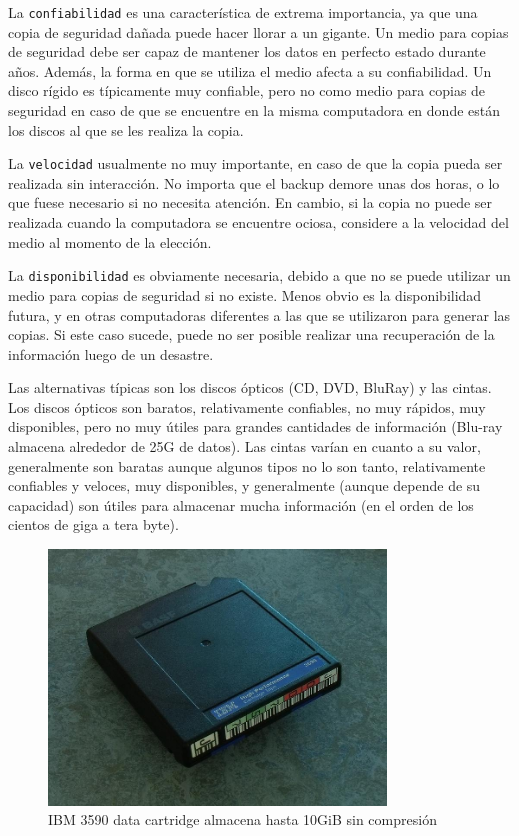 \documentclass[12pt]{article}
\begin{document}
La \texttt{confiabilidad} es una característica de extrema importancia, 
ya que una 
copia de seguridad dañada puede hacer llorar a un gigante. Un medio para 
copias de seguridad debe ser capaz de mantener los datos en perfecto 
estado durante años. Además, la forma en que se utiliza el medio afecta 
a su confiabilidad. Un disco rígido es típicamente muy confiable, pero 
no como medio para copias de seguridad en caso de que se encuentre en 
la misma computadora en donde están los discos al que se les realiza la 
copia.

La \texttt{velocidad} usualmente no muy importante, en caso de que la 
copia pueda ser
realizada sin interacción. No importa que el backup demore unas 
dos horas, o lo que fuese necesario si no necesita atención. En cambio, si 
la copia no puede ser realizada cuando la computadora se encuentre ociosa, 
considere a la velocidad del medio al momento de la elección.

La \texttt{disponibilidad} es obviamente necesaria, debido a que no se 
puede utilizar
un medio para copias de seguridad si no existe. Menos obvio es la 
disponibilidad futura, y en otras computadoras diferentes a las que se 
utilizaron para generar las copias.
Si este caso sucede, puede no ser posible realizar una recuperación de la 
información luego de un desastre.

Las alternativas típicas son los discos ópticos (CD, DVD, BluRay) y las
cintas. Los discos ópticos son baratos, relativamente confiables, no muy 
rápidos, muy disponibles, pero no muy útiles para grandes cantidades de 
información (Blu-ray almacena alrededor de 25G de datos). Las 
cintas varían en cuanto a su valor, generalmente son baratas aunque algunos
tipos no lo son tanto, relativamente confiables y veloces, muy disponibles, 
y generalmente (aunque depende de su capacidad) son útiles para almacenar 
mucha información (en el orden de los cientos de giga a tera byte). 


\begin{figure}[h]
\centering
\includegraphics[width=0.8\textwidth]{3590Tape.JPG}
\renewcommand{\figurename}{Fig.}
\caption{IBM 3590 data cartridge almacena hasta 10GiB sin compresión}
\label{contexto:figura}
\end{figure}
\end{document}

